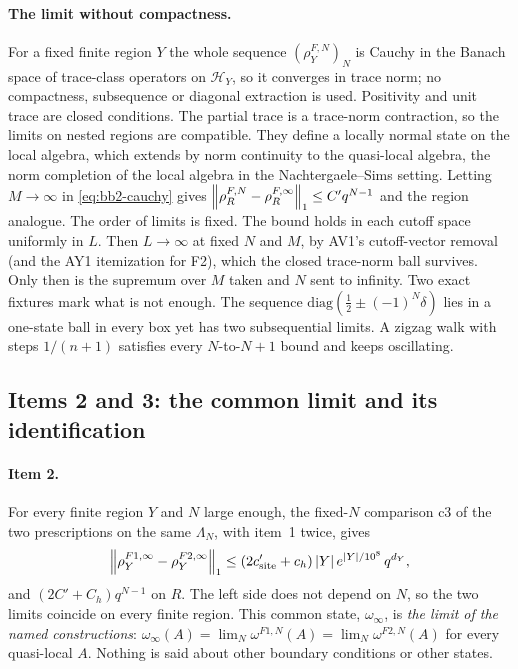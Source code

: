 \paragraph{The limit without compactness.} For a fixed finite region $Y$ the
whole sequence $(\rho^{F,N}_Y)_N$ is Cauchy in the Banach space of trace-class
operators on $\mathcal H_Y$, so it converges in trace norm; no compactness,
subsequence or diagonal extraction is used. Positivity and unit trace are
closed conditions. The partial trace is a trace-norm contraction, so the
limits on nested regions are compatible. They define a locally normal state
on the local algebra, which extends by norm continuity to the quasi-local
algebra, the norm completion of the local algebra in the Nachtergaele--Sims
setting. Letting $M\to\infty$ in \eqref{eq:bb2-cauchy} gives
$\left\lVert\rho^{F,N}_R-\rho^{F,\infty}_R\right\rVert_1\le C'q^{N-1}$ and the region analogue.
The order of limits is fixed. The bound holds in each cutoff space
uniformly in $L$. Then $L\to\infty$ at fixed $N$ and $M$, by AV1's
cutoff-vector removal (and the AY1 itemization for F2), which the closed
trace-norm ball survives. Only then is the supremum over $M$ taken and $N$
sent to infinity. Two exact fixtures mark what is not enough. The sequence
$\mathrm{diag}(\tfrac12\pm(-1)^N\delta)$ lies in a one-state ball in every
box yet has two subsequential limits. A zigzag walk with steps $1/(n+1)$
satisfies every $N$-to-$N+1$ bound and keeps oscillating.

\subsection{Items 2 and 3: the common limit and its identification}
\label{sec:bb2-items23}
\paragraph{Item 2.} For every finite region $Y$ and $N$ large enough, the
fixed-$N$ comparison c3 of the two prescriptions on the same $\Lambda_N$,
with item~1 twice, gives
\begin{equation}
 \left\lVert\rho^{F1,\infty}_Y-\rho^{F2,\infty}_Y\right\rVert_1\le(2c'_{\rm site}+c_h)\,|Y|\,e^{|Y|/10^8}\,q^{d_Y},
 \label{eq:bb2-common}
\end{equation}
and $(2C'+C_h)q^{N-1}$ on $R$. The left side does not depend on $N$, so the
two limits coincide on every finite region. This common state,
$\omega_\infty$, is \emph{the limit of the named constructions}:
$\omega_\infty(A)=\lim_N\omega^{F1,N}(A)=\lim_N\omega^{F2,N}(A)$ for every
quasi-local $A$. Nothing is said about other boundary conditions or other
states.

